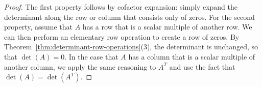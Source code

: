 \begin{proof}
  The first property follows by cofactor expansion: simply expand the
  determinant along the row or column that consists only of zeros.
  For the second property, assume that $A$ has a row that is a scalar
  multiple of another row. We can then perform an elementary row
  operation to create a row of zeros. By
  Theorem~\ref{thm:determinant-row-operations}(3), the determinant is
  unchanged, so that $\det(A)=0$. In the case that $A$ has a column
  that is a scalar multiple of another column, we apply the same
  reasoning to $A^T$ and use the fact that $\det(A)=\det(A^T)$.
\end{proof}

